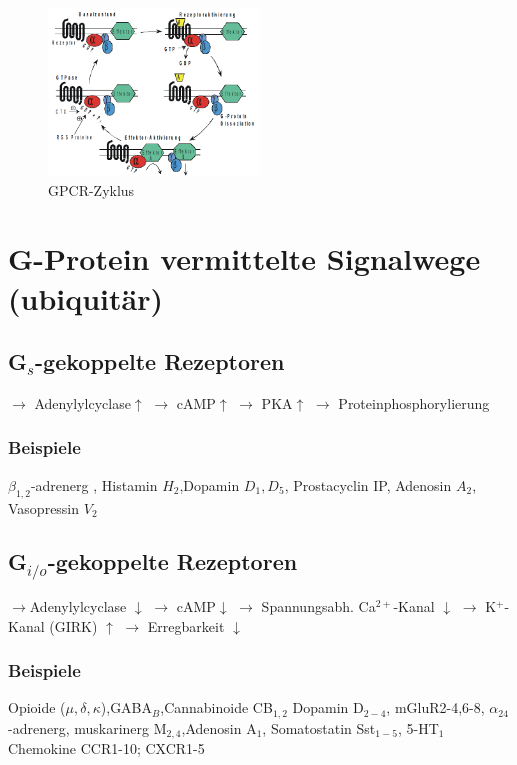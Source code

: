 \documentclass[10pt,a4paper]{report}
\begin{document}
\begin{figure}
	\centering
	\includegraphics[width=0.5\textwidth]{Bilder/gproteinzyklus.png}
	\caption{GPCR-Zyklus}
	\label{fig:gpcrzyklus}
\end{figure}

\section{G-Protein vermittelte Signalwege (ubiquitär)}

\subsection{G$_s$-gekoppelte Rezeptoren}
$\rightarrow$ Adenylylcyclase$\uparrow$ $\rightarrow$ cAMP$\uparrow$ $\rightarrow$ PKA$\uparrow$ $\rightarrow$ Proteinphosphorylierung

\subsubsection{Beispiele}
$\beta_{1,2}$-adrenerg	, Histamin $H_2$,Dopamin $D_1,D_5$, Prostacyclin IP, Adenosin $A_2$, Vasopressin $V_2$

\subsection{G$_{i/o}$-gekoppelte Rezeptoren}
$\rightarrow$Adenylylcyclase $\downarrow$ $\rightarrow$ cAMP$\downarrow$
$\rightarrow$ Spannungsabh. Ca$^{2+}$-Kanal $\downarrow$ 
$\rightarrow$ K$^+$-Kanal (GIRK) $\uparrow$
$\rightarrow$ Erregbarkeit $\downarrow$

\subsubsection{Beispiele}
Opioide ($\mu,\delta,\kappa$),GABA$_B$,Cannabinoide CB$_{1,2}$	Dopamin D$_{2-4}$, mGluR2-4,6-8, $\alpha_24$-adrenerg, muskarinerg M$_{2,4}$,Adenosin A$_1$, Somatostatin Sst$_{1-5}$, 5-HT$_1$
Chemokine CCR1-10; CXCR1-5 
\end{document}
